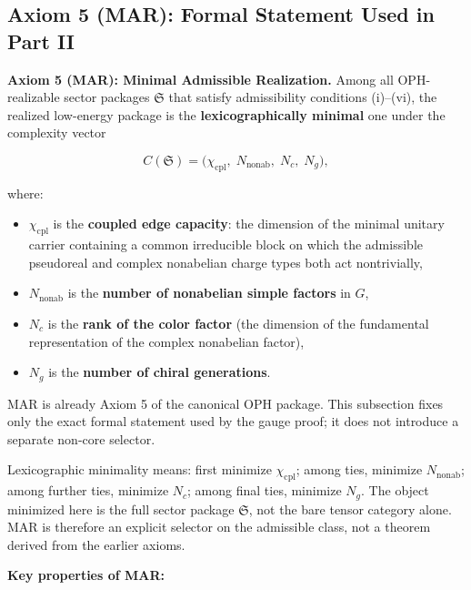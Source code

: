 \subsection{Axiom 5 (MAR): Formal Statement Used in Part II}\label{3-selection-axiom-mar}

\textbf{Axiom 5 (MAR): Minimal Admissible Realization.} Among all OPH-realizable sector packages \(\mathfrak S\) that satisfy admissibility conditions (i)--(vi), the realized low-energy package is the \textbf{lexicographically minimal} one under the complexity vector

\[C(\mathfrak S) = \bigl(\chi_{\mathrm{cpl}},\; N_{\mathrm{nonab}},\; N_c,\; N_g\bigr),\]

where:

\begin{itemize}
\tightlist
\item
  \(\chi_{\mathrm{cpl}}\) is the \textbf{coupled edge capacity}: the dimension of the minimal unitary carrier containing a common irreducible block on which the admissible pseudoreal and complex nonabelian charge types both act nontrivially,
\item
  \(N_{\mathrm{nonab}}\) is the \textbf{number of nonabelian simple factors} in \(G\),
\item
  \(N_c\) is the \textbf{rank of the color factor} (the dimension of the fundamental representation of the complex nonabelian factor),
\item
  \(N_g\) is the \textbf{number of chiral generations}.
\end{itemize}

MAR is already Axiom 5 of the canonical OPH package. This subsection fixes only the exact formal statement used by the gauge proof; it does not introduce a separate non-core selector.

Lexicographic minimality means: first minimize \(\chi_{\mathrm{cpl}}\); among ties, minimize \(N_{\mathrm{nonab}}\); among further ties, minimize \(N_c\); among final ties, minimize \(N_g\). The object minimized here is the full sector package \(\mathfrak S\), not the bare tensor category alone. MAR is therefore an explicit selector on the admissible class, not a theorem derived from the earlier axioms.

\textbf{Key properties of MAR:}

